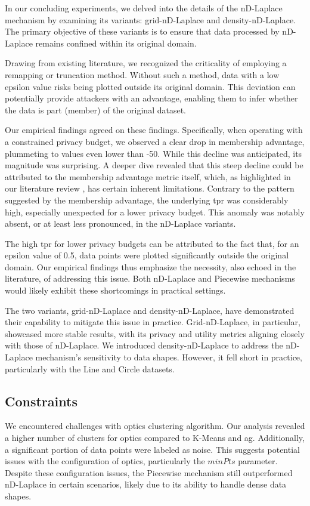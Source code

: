 In our concluding experiments, we delved into the details of the nD-Laplace mechanism by examining its variants: grid-nD-Laplace and density-nD-Laplace. The primary objective of these variants is to ensure that data processed by nD-Laplace remains confined within its original domain.

Drawing from existing literature, we recognized the criticality of employing a remapping or truncation method. Without such a method, data with a low epsilon value risks being plotted outside its original domain. This deviation can potentially provide attackers with an advantage, enabling them to infer whether the data is part (member) of the original dataset.

Our empirical findings agreed on these findings. Specifically, when operating with a constrained privacy budget, we observed a clear drop in membership advantage, plummeting to values even lower than -50. While this decline was anticipated, its magnitude was surprising. A deeper dive revealed that this steep decline could be attributed to the membership advantage metric itself, which, as highlighted in our literature review , has certain inherent limitations. Contrary to the pattern suggested by the membership advantage, the underlying \gls{tpr} was considerably high, especially unexpected for a lower privacy budget. This anomaly was notably absent, or at least less pronounced, in the nD-Laplace variants. 

The high \gls{tpr} for lower privacy budgets can be attributed to the fact that, for an epsilon value of 0.5, data points were plotted significantly outside the original domain. Our empirical findings thus emphasize the necessity, also echoed in the literature, of addressing this issue. Both nD-Laplace and Piecewise mechanisms would likely exhibit these shortcomings in practical settings.

The two variants, grid-nD-Laplace and density-nD-Laplace, have demonstrated their capability to mitigate this issue in practice. Grid-nD-Laplace, in particular, showcased more stable results, with its privacy and utility metrics aligning closely with those of nD-Laplace. We introduced density-nD-Laplace to address the nD-Laplace mechanism's sensitivity to data shapes. However, it fell short in practice, particularly with the Line and Circle datasets.

\subsection{Constraints}
We encountered challenges with \gls{optics} clustering algorithm.
Our analysis revealed a higher number of clusters for \gls{optics} compared to K-Means and \gls{ag}. Additionally, a significant portion of data points were labeled as noise. This suggests potential issues with the configuration of \gls{optics}, particularly the $minPts$ parameter. Despite these configuration issues, the Piecewise mechanism still outperformed nD-Laplace in certain scenarios, likely due to its ability to handle dense data shapes.


